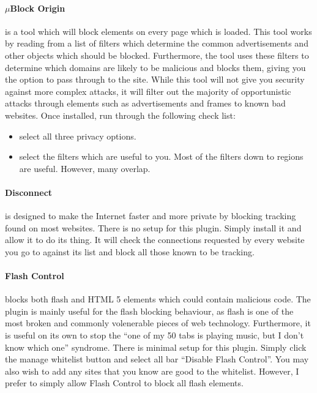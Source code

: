 \documentclass[a4paper,11pt,draft]{article}
\begin{document}
		\paragraph{$\mu{}$Block Origin}
			is a tool which will block elements on every page which is loaded. 
			This tool works by reading from a list of filters which determine the common advertisements and other objects which should be blocked. 
			Furthermore, the tool uses these filters to determine which domains are likely to be malicious and blocks them, giving you the option to pass through to the site. 
			While this tool will not give you security against more complex attacks, it will filter out the majority of opportunistic attacks through elements such as advertisements and frames to known bad websites. 
			Once installed, run through the following check list: 
			\begin{itemize}
				\item select all three privacy options.
				\item select the filters which are useful to you. 
					Most of the filters down to regions are useful. However, many overlap. 
			\end{itemize}
		\paragraph{Disconnect}
			is designed to make the Internet faster and more private by blocking tracking found on most websites. 
			There is no setup for this plugin. Simply install it and allow it to do its thing. 
			It will check the connections requested by every website you go to against its list and block all those known to be tracking. 
		\paragraph{Flash Control}
			blocks both flash and HTML 5 elements which could contain malicious code. 
			The plugin is mainly useful for the flash blocking behaviour, as flash is one of the most broken and commonly volenerable pieces of web technology. 
			Furthermore, it is useful on its own to stop the ``one of my 50 tabs is playing music, but I don't know which one'' syndrome. 
			There is minimal setup for this plugin. Simply click the manage whitelist button and select all bar ``Disable Flash Control''. 
			You may also wish to add any sites that you know are good to the whitelist. 
			However, I prefer to simply allow Flash Control to block all flash elements. 
\end{document}
